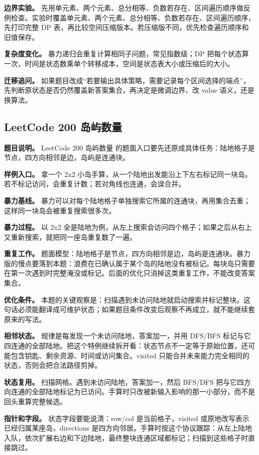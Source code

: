\textbf{边界实验。} 先用单元素、两个元素、总分相等、负数若存在、区间遍历顺序做反例检查。实验时覆盖单元素、两个元素、总分相等、负数若存在、区间遍历顺序，先打印完整 DP 表，再比较空间压缩版本。若压缩版不同，优先检查遍历顺序和旧值保存。

\textbf{复杂度变化。} 暴力递归会重复计算相同子问题，常见指数级；DP 把每个状态算一次，时间是状态数乘单个转移成本，空间是状态表大小或压缩后的大小。

\textbf{迁移追问。} 如果题目改成“若要输出具体策略，需要记录每个区间选择的端点”，先判断原状态是否仍然覆盖新答案集合，再决定是微调边界、改 value 语义，还是换算法。

\subsection{LeetCode 200 岛屿数量}

\textbf{题目说明。} LeetCode 200 岛屿数量 的题面入口要先还原成具体任务：陆地格子是节点，四方向相邻是边，岛屿是连通块。

\textbf{样例入口。} 拿一个 2x2 小岛手算，从一个陆地出发能沿上下左右标记同一块岛。若不标记访问，会重复计数；若对角线也连通，会误合并。

\textbf{暴力基线。} 暴力可以对每个陆地格子单独搜索它所属的连通块，再用集合去重；这样同一块岛会被重复搜索很多次。

\textbf{暴力过程。} 以 2x2 全是陆地为例，从左上搜索会访问四个格子；如果之后从右上又重新搜索，就把同一座岛重复数了一遍。

\textbf{重复工作。} 题面模型：陆地格子是节点，四方向相邻是边，岛屿是连通块。暴力版的慢点要落到本题：浪费在已确认属于某个岛的陆地没有被标记。每块岛只需要在第一次遇到时完整淹没或标记。后面的优化只消掉这类重复工作，不能改变答案集合。

\textbf{优化条件。} 本题的关键观察是：扫描遇到未访问陆地就启动搜索并标记整块。这句话必须能翻译成可维护状态；如果题目条件改变后观察不再成立，就不能继续套原来的写法。

\textbf{相邻状态。} 规律是每发现一个未访问陆地，答案加一，并用 DFS/BFS 标记与它四连通的全部陆地。把这个特例继续拆开看：状态节点不一定等于原始位置，还可能包含钥匙、剩余资源、时间或访问集合。visited 只能合并未来能力完全相同的状态，否则会把合法路径剪掉。

\textbf{状态复用。} 扫描网格。遇到未访问陆地，答案加一，然后 BFS/DFS 把与它四方向连通的全部陆地标记为已访问。手算时只改被新输入影响的那一小部分，而不是回头重算完整候选。

\textbf{指针和字段。} 状态字段要能说清：row/col 是当前格子，visited 或原地改写表示已经归属某座岛，directions 是四方向邻居。手算时按这个协议跟踪：从左上陆地入队，依次扩展右边和下边陆地，最终整块连通区域都标记；扫描到这些格子时直接跳过。

